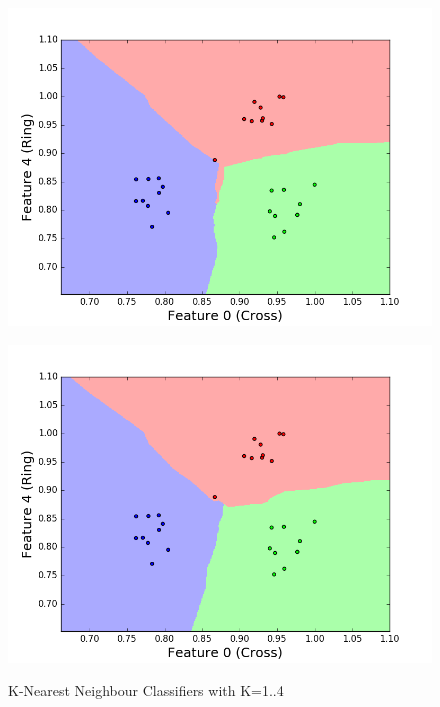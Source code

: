 \documentclass[11pt, a4paper]{article}
\begin{document}
\begin{figure}
\begin{minipage}[b]{.5\textwidth}
\includegraphics[width=1\textwidth]{training_plot_k3.png}
\label{fig:1b}
\end{minipage}%
\begin{minipage}[b]{.5\textwidth}
\centering
\includegraphics[width=1\textwidth]{training_plot_k4.png}
\label{fig:1b}
\end{minipage}
\caption{K-Nearest Neighbour Classifiers with K=1..4}\label{fig:1}
\end{figure}

\end{document}
